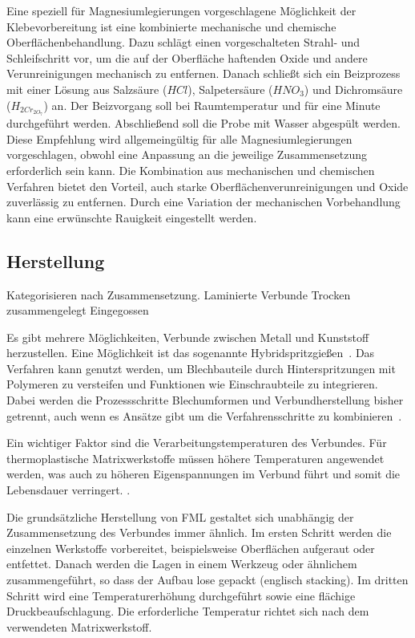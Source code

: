 Eine speziell für Magnesiumlegierungen vorgeschlagene Möglichkeit der Klebevorbereitung ist eine kombinierte mechanische und chemische Oberflächenbehandlung.
Dazu schlägt \cite{Handbuch.1991} einen vorgeschalteten Strahl- und Schleifschritt vor, um die auf der Oberfläche haftenden Oxide und andere Verunreinigungen mechanisch zu entfernen.
Danach schließt sich ein Beizprozess mit einer Lösung aus Salzsäure ($HCl$), Salpetersäure ($HNO_3$) und Dichromsäure ($H_{2Cr}_{2O}_7$) an.
Der Beizvorgang soll bei Raumtemperatur und für eine Minute durchgeführt werden.
Abschließend soll die Probe mit Wasser abgespült werden.
Diese Empfehlung wird allgemeingültig für alle Magnesiumlegierungen vorgeschlagen, obwohl eine Anpassung an die jeweilige Zusammensetzung erforderlich sein kann.
Die Kombination aus mechanischen und chemischen Verfahren bietet den Vorteil, auch starke Oberflächenverunreinigungen und Oxide zuverlässig zu entfernen.
Durch eine Variation der mechanischen Vorbehandlung kann eine erwünschte Rauigkeit eingestellt werden.

\subsection{Herstellung}\label{subsec:herstellung}

Kategorisieren nach Zusammensetzung.
Laminierte Verbunde
Trocken zusammengelegt
Eingegossen

Es gibt mehrere Möglichkeiten, Verbunde zwischen Metall und Kunststoff herzustellen.
Eine Möglichkeit ist das sogenannte Hybridspritzgießen~\cite{ridder}.
Das Verfahren kann genutzt werden, um Blechbauteile durch Hinterspritzungen mit Polymeren zu versteifen und Funktionen wie Einschraubteile zu integrieren.
Dabei werden die Prozessschritte Blechumformen und Verbundherstellung bisher getrennt, auch wenn es Ansätze gibt um die Verfahrensschritte zu kombinieren~\cite{LEIKA.2017}.

Ein wichtiger Faktor sind die Verarbeitungstemperaturen des Verbundes.
Für thermoplastische Matrixwerkstoffe müssen höhere Temperaturen angewendet werden, was auch zu höheren Eigenspannungen im Verbund führt und somit die Lebensdauer verringert. \cite{Alderliesten.2008}.

Die grundsätzliche Herstellung von FML gestaltet sich unabhängig der Zusammensetzung des Verbundes immer ähnlich.
Im ersten Schritt werden die einzelnen Werkstoffe vorbereitet, beispielsweise Oberflächen aufgeraut oder entfettet.
Danach werden die Lagen in einem Werkzeug oder ähnlichem zusammengeführt, so dass der Aufbau lose gepackt (englisch \glqq stacking\grqq).
Im dritten Schritt wird eine Temperaturerhöhung durchgeführt sowie eine flächige Druckbeaufschlagung.
Die erforderliche Temperatur richtet sich nach dem verwendeten Matrixwerkstoff.

